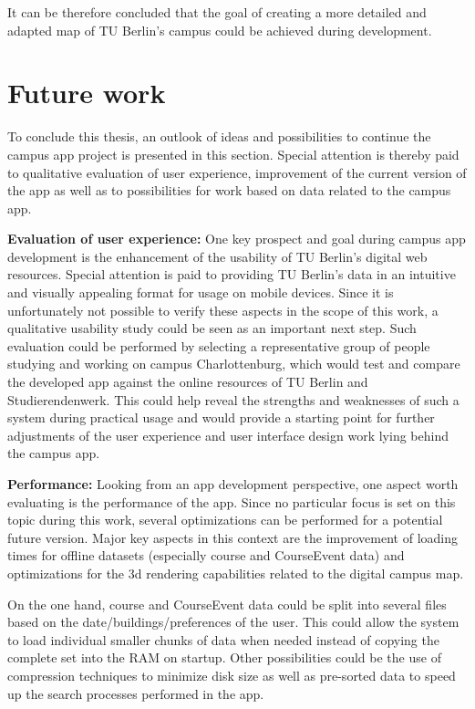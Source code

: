 It can be therefore concluded that the goal of creating a more detailed and adapted map of TU Berlin's campus could be achieved during development.

\section{Future work} \label{sec:future_work}
To conclude this thesis, an outlook of ideas and possibilities to continue the campus app project is presented in this section. Special attention is thereby paid to qualitative evaluation of user experience, improvement of the current version of the app as well as to possibilities for work based on data related to the campus app.

\textbf{Evaluation of user experience:} One key prospect and goal during campus app development is the enhancement of the usability of TU Berlin's digital web resources. Special attention is paid to providing TU Berlin's data in an intuitive and visually appealing format for usage on mobile devices. Since it is unfortunately not possible to verify these aspects in the scope of this work, a qualitative usability study could be seen as an important next step. Such evaluation could be performed by selecting a representative group of people studying and working on campus Charlottenburg, which would test and compare the developed app against the online resources of TU Berlin and Studierendenwerk. This could help reveal the strengths and weaknesses of such a system during practical usage and would provide a starting point for further adjustments of the user experience and user interface design work lying behind the campus app.

\newpage

\textbf{Performance:} Looking from an app development perspective, one aspect worth evaluating is the performance of the app. Since no particular focus is set on this topic during this work, several optimizations can be performed for a potential future version. Major key aspects in this context are the improvement of loading times for offline datasets (especially course and CourseEvent data) and optimizations for the 3d rendering capabilities related to the digital campus map.

On the one hand, course and CourseEvent data could be split into several files based on the date/buildings/preferences of the user. This could allow the system to load individual smaller chunks of data when needed instead of copying the complete set into the RAM on startup. Other possibilities could be the use of compression techniques to minimize disk size as well as pre-sorted data to speed up the search processes performed in the app.


